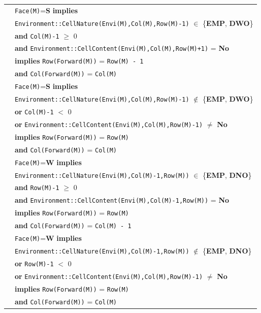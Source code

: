 \documentclass[12pt]{report}
\begin{document}
\begin{tabular}{rl}

&\texttt{Face(M)}=\textbf{S} \textbf{implies} \\
& \texttt{Environment::CellNature(Envi(M),Col(M),Row(M)-1)} $\in$ \{\textbf{EMP}, \textbf{DWO}\} \\
& \textbf{and} \texttt{Col(M)-1} $\geq$ 0 \\
& \textbf{and} \texttt{Environment::CellContent(Envi(M),Col(M),Row(M)+1)} = \textbf{No} \\
& \textbf{implies} \texttt{Row(Forward(M))} = \texttt{Row(M) - 1} \\
& \textbf{and} \texttt{Col(Forward(M))} = \texttt{Col(M)} \\
& \texttt{Face(M)}=\textbf{S} \textbf{implies} \\
& \texttt{Environment::CellNature(Envi(M),Col(M),Row(M)-1)} $\notin$ \{\textbf{EMP}, \textbf{DWO}\} \\
& \textbf{or} \texttt{Col(M)-1} $<$ 0 \\
& \textbf{or} \texttt{Environment::CellContent(Envi(M),Col(M),Row(M)-1)} $\neq$ \textbf{No} \\
& \textbf{implies} \texttt{Row(Forward(M))} = \texttt{Row(M)} \\
& \textbf{and} \texttt{Col(Forward(M))} = \texttt{Col(M)} \\
& \texttt{Face(M)}=\textbf{W} \textbf{implies} \\
& \texttt{Environment::CellNature(Envi(M),Col(M)-1,Row(M))} $\in$ \{\textbf{EMP}, \textbf{DNO}\} \\
& \textbf{and} \texttt{Row(M)-1} $\geq$ 0 \\
& \textbf{and} \texttt{Environment::CellContent(Envi(M),Col(M)-1,Row(M))} = \textbf{No} \\
& \textbf{implies} \texttt{Row(Forward(M))} = \texttt{Row(M)} \\
& \textbf{and} \texttt{Col(Forward(M))} = \texttt{Col(M) - 1} \\
& \texttt{Face(M)}=\textbf{W} \textbf{implies} \\
& \texttt{Environment::CellNature(Envi(M),Col(M)-1,Row(M))} $\notin$ \{\textbf{EMP}, \textbf{DNO}\} \\
& \textbf{or} \texttt{Row(M)-1} $<$ 0 \\
& \textbf{or} \texttt{Environment::CellContent(Envi(M),Col(M),Row(M)-1)} $\neq$ \textbf{No} \\
& \textbf{implies} \texttt{Row(Forward(M))} = \texttt{Row(M)} \\
& \textbf{and} \texttt{Col(Forward(M))} = \texttt{Col(M)} \\
\end{tabular}
\end{document}
